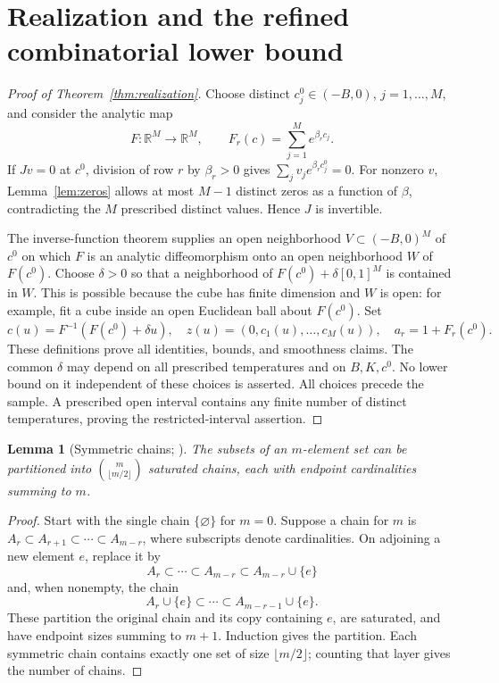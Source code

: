 \documentclass[10pt]{article}
\newtheorem{lemma}[theorem]{Lemma}
\theoremstyle{definition}\newtheorem{definition}[theorem]{Definition}
\theoremstyle{remark}\newtheorem{remark}[theorem]{Remark}
\newcommand{\R}{\mathbb R}
\newcommand{\1}{\mathbf 1}
\begin{document}
\section{Realization and the refined combinatorial lower bound}\label{app:realization}
\begin{proof}[Proof of Theorem~\ref{thm:realization}]
Choose distinct $c_j^0\in(-B,0)$, $j=1,\ldots,M$, and consider the analytic map
\[
 F:\R^M\to\R^M,\qquad F_r(c)=\sum_{j=1}^M e^{\beta_r c_j}.
\]
If $Jv=0$ at $c^0$, division of row $r$ by $\beta_r>0$ gives $\sum_jv_je^{\beta_rc_j^0}=0$. For nonzero $v$, Lemma~\ref{lem:zeros} allows at most $M-1$ distinct zeros as a function of $\beta$, contradicting the $M$ prescribed distinct values. Hence $J$ is invertible.

The inverse-function theorem supplies an open neighborhood $V\subset(-B,0)^M$ of $c^0$ on which $F$ is an analytic diffeomorphism onto an open neighborhood $W$ of $F(c^0)$. Choose $\delta>0$ so that a neighborhood of $F(c^0)+\delta[0,1]^M$ is contained in $W$. This is possible because the cube has finite dimension and $W$ is open: for example, fit a cube inside an open Euclidean ball about $F(c^0)$. Set
\[
 c(u)=F^{-1}(F(c^0)+\delta u),\quad
 z(u)=(0,c_1(u),\ldots,c_M(u)),\quad a_r=1+F_r(c^0).
\]
These definitions prove all identities, bounds, and smoothness claims. The common $\delta$ may depend on all prescribed temperatures and on $B,K,c^0$. No lower bound on it independent of these choices is asserted. All choices precede the sample. A prescribed open interval contains any finite number of distinct temperatures, proving the restricted-interval assertion.
\end{proof}

\begin{lemma}[Symmetric chains; \citealp{debruijn1951}]\label{lem:chains}
The subsets of an $m$-element set can be partitioned into $\binom m{\lfloor m/2\rfloor}$ saturated chains, each with endpoint cardinalities summing to $m$.
\end{lemma}
\begin{proof}
Start with the single chain $\{\varnothing\}$ for $m=0$. Suppose a chain for $m$ is $A_r\subset A_{r+1}\subset\cdots\subset A_{m-r}$, where subscripts denote cardinalities. On adjoining a new element $e$, replace it by
\[
 A_r\subset\cdots\subset A_{m-r}\subset A_{m-r}\cup\{e\}
\]
and, when nonempty, the chain
\[
 A_r\cup\{e\}\subset\cdots\subset A_{m-r-1}\cup\{e\}.
\]
These partition the original chain and its copy containing $e$, are saturated, and have endpoint sizes summing to $m+1$. Induction gives the partition. Each symmetric chain contains exactly one set of size $\lfloor m/2\rfloor$; counting that layer gives the number of chains.
\end{proof}
\end{document}
